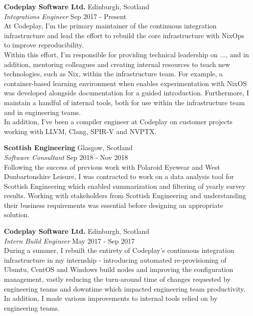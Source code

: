 \documentclass[a4paper]{article}
\begin{document}
\textbf{Codeplay Software Ltd.} \hfill {\color{gray} Edinburgh, Scotland} \\
\textit{Integrations Engineer} \hfill {\color{gray} Sep 2017 - Present} \\
\vspace{2mm}
At Codeplay, I'm the primary maintainer of the continuous integration infrastructure and lead
the effort to rebuild the core infrastructure with NixOps to improve reproducibility. \\
\vspace{2mm}
Within this effort, I'm responsible for providing technical leadership on ..., and in addition,
mentoring colleagues and creating internal resources to teach new technologies, such as Nix, within
the infrastructure team. For example, a container-based learning environment when enables
experimentation with NixOS was developed alongside documentation for a guided introduction.
Furthermore, I maintain a handful of internal tools, both for use within the infrastructure team
and in engineering teams. \\
\vspace{2mm}
In addition, I've been a compiler engineer at Codeplay on customer projects working with LLVM,
Clang, SPIR-V and NVPTX.
\vspace{2mm}

\textbf{Scottish Engineering} \hfill {\color{gray} Glasgow, Scotland} \\
\textit{Software Consultant} \hfill {\color{gray} Sep 2018 - Nov 2018} \\
\vspace{2mm}
Following the success of previous work with Polaroid Eyewear and West Dunbartonshire Leisure, I
was contracted to work on a data analysis tool for Scottish Engineering which enabled summarization
and filtering of yearly survey results. Working with stakeholders from Scottish Engineering and
understanding their business requirements was essential before designing an appropriate solution.
\vspace{2mm}

\textbf{Codeplay Software Ltd.} \hfill {\color{gray} Edinburgh, Scotland} \\
\textit{Intern Build Engineer} \hfill {\color{gray} May 2017 - Sep 2017} \\
\vspace{2mm}
During a summer, I rebuilt the entirety of Codeplay's continuous integration infrastructure
in my internship - introducing automated re-provisioning of Ubuntu, CentOS and Windows build nodes
and improving the configuration management, vastly reducing the turn-around time of changes
requested by engineering teams and downtime which impacted engineering team productivity. In
addition, I made various improvements to internal tools relied on by engineering teams.
\vspace{2mm}
\end{document}
